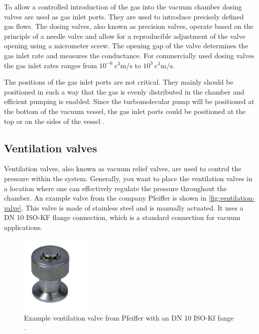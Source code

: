 To allow a controlled introduction of the gas into the vacuum chamber dosing valves are used as gas inlet ports.
They are used to introduce precisely defined gas flows.
The dosing valves, also known as precision valves, operate based on the principle of a needle valve and allow for a reproducible adjustment of the valve opening using a micrometer screw.
The opening gap of the valve determines the gas inlet rate and measures the conductance.
For commercially used dosing valves the gas inlet rates ranges from $10^{-6}~\si{\cubic\centi\meter\per\second}$ to $10^{3}~\si{\cubic\centi\meter\per\second}$.

The positions of the gas inlet ports are not critical.
They mainly should be positioned in such a way that the gas is evenly distributed in the chamber and efficient pumping is enabled.
Since the turbomolecular pump will be positioned at the bottom of the vacuum vessel, the gas inlet ports could be positioned at the top or on the sides of the vessel \cite{Wutz2000}.

\subsection{Ventilation valves}
Ventilation valves, also known as vacuum relief valves, are used to control the pressure within the system.
Generally, you want to place the ventilation valves in a location where one can effectively regulate the pressure throughout the chamber.
An example valve from the company Pfeiffer is shown in \autoref{fig:ventilation-valve}.
This valve is made of stainless steel and is manually actuated.
It uses a DN 10 ISO-KF flange connection, which is a standard connection for vacuum applications.

\begin{figure}[H]
    \centering
    \includegraphics[width=0.3\textwidth]{sections/imges/ports/venting_valve.png}
    \caption{Example ventilation valve from Pfeiffer with an DN 10 ISO-Kf fange \cite{pfeiffer_venting_valve}.}
    \label{fig:ventilation-valve}
\end{figure}


